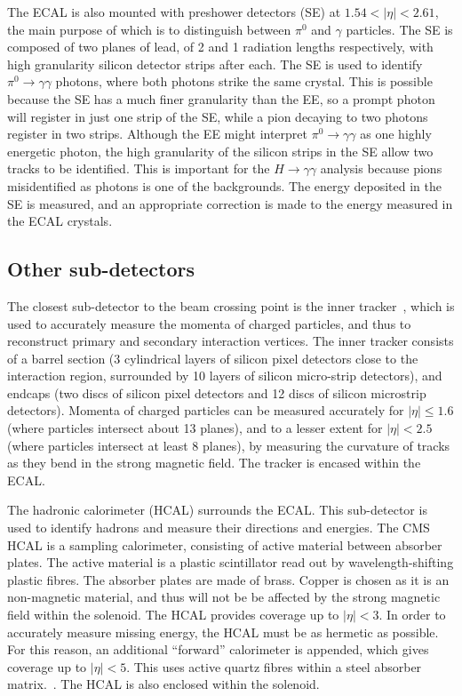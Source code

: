 \documentclass[10pt]{article}
\begin{document}
The ECAL is also mounted with preshower detectors (SE) at $1.54 <|\eta| < 2.61$, the main purpose of which is to distinguish between $\pi^0$ and $\gamma$ particles. The SE is composed of two planes of lead, of 2 and 1 radiation lengths respectively, with high granularity silicon detector strips after each. The SE is used to identify $\pi^0\rightarrow \gamma \gamma$ photons, where both photons strike the same crystal. This is possible because the SE has a much finer granularity than the EE, so a prompt photon will register in just one strip of the SE, while a pion decaying to two photons register in two strips. Although the EE might interpret $\pi^0\rightarrow \gamma \gamma$ as one highly energetic photon, the high granularity of the silicon strips in the SE allow two tracks to be identified. This is important for the $H\rightarrow\gamma\gamma$ analysis because pions misidentified as photons is one of the backgrounds. The energy deposited in the SE is measured, and an appropriate correction is made to the energy measured in the ECAL crystals.

\subsection{Other sub-detectors}

The closest sub-detector to the beam crossing point is the inner tracker~\cite{cmsTrk}, which is used to accurately measure the momenta of charged particles, and thus to reconstruct primary and secondary interaction vertices. The inner tracker consists of a barrel section (3 cylindrical layers of silicon pixel detectors close to the interaction region, surrounded by 10 layers of silicon micro-strip detectors), and endcaps (two discs of silicon pixel detectors and 12 discs of silicon microstrip detectors). Momenta of charged particles can be measured accurately for $|\eta|\leq 1.6$ (where particles intersect about 13 planes), and to a lesser extent for $|\eta| <2.5$ (where particles intersect at least 8 planes), by measuring the curvature of tracks as they bend in the strong magnetic field. The tracker is encased within the ECAL.

The hadronic calorimeter (HCAL) surrounds the ECAL. This sub-detector is used to identify hadrons and measure their directions and energies. The CMS HCAL is a sampling calorimeter, consisting of active material between absorber plates. The active material is a plastic scintillator read out by  wavelength-shifting plastic fibres. The absorber plates are made of brass. Copper is chosen as it is an non-magnetic material, and thus will not be be affected by the strong magnetic field within the solenoid. The HCAL provides coverage up to $|\eta| < 3$. In order to accurately measure missing energy, the HCAL must be as hermetic as possible. For this reason, an additional ``forward'' calorimeter is appended, which gives coverage up to $|\eta| <5$. This uses active quartz fibres within a steel absorber matrix.~\cite{cmsHcal}. The HCAL is also enclosed within the solenoid.
\end{document}

